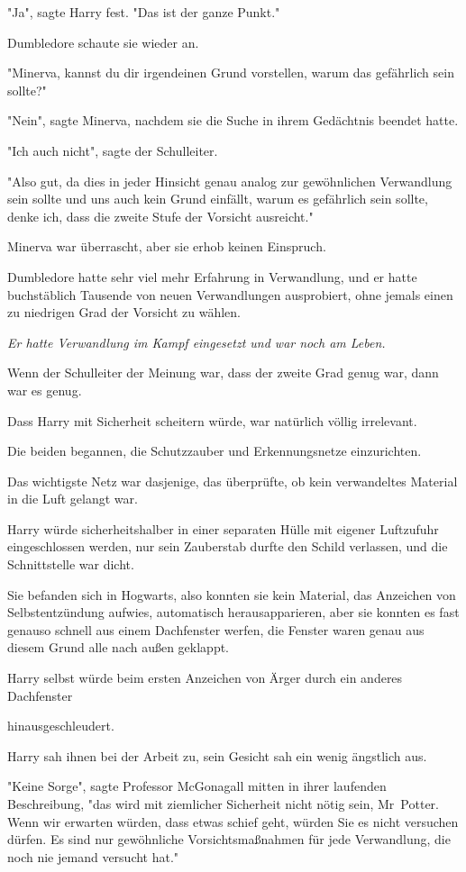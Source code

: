 {"Ja", sagte Harry fest. "Das ist der ganze Punkt."

Dumbledore schaute sie wieder an.

"Minerva, kannst du dir irgendeinen Grund vorstellen, warum das gefährlich sein sollte?"

"Nein", sagte Minerva, nachdem sie die Suche in ihrem Gedächtnis beendet hatte.

"Ich auch nicht", sagte der Schulleiter.

"Also gut, da dies in jeder Hinsicht genau analog zur gewöhnlichen Verwandlung sein sollte und uns auch kein Grund einfällt, warum es gefährlich sein sollte, denke ich, dass die zweite Stufe der Vorsicht ausreicht."

Minerva war überrascht, aber sie erhob keinen Einspruch.

Dumbledore hatte sehr viel mehr Erfahrung in Verwandlung, und er hatte buchstäblich Tausende von neuen Verwandlungen ausprobiert, ohne jemals einen zu niedrigen Grad der Vorsicht zu wählen.

\emph{Er hatte Verwandlung im Kampf eingesetzt und war noch am Leben.}

Wenn der Schulleiter der Meinung war, dass der zweite Grad genug war, dann war es genug.

Dass Harry mit Sicherheit scheitern würde, war natürlich völlig irrelevant.

Die beiden begannen, die Schutzzauber und Erkennungsnetze einzurichten.

Das wichtigste Netz war dasjenige, das überprüfte, ob kein verwandeltes Material in die Luft gelangt war.

Harry würde sicherheitshalber in einer separaten Hülle mit eigener Luftzufuhr eingeschlossen werden, nur sein Zauberstab durfte den Schild verlassen, und die Schnittstelle war dicht.

Sie befanden sich in Hogwarts, also konnten sie kein Material, das Anzeichen von Selbstentzündung aufwies, automatisch herausapparieren, aber sie konnten es fast genauso schnell aus einem Dachfenster werfen, die Fenster waren genau aus diesem Grund alle nach außen geklappt.

Harry selbst würde beim ersten Anzeichen von Ärger durch ein anderes Dachfenster

hinausgeschleudert.

Harry sah ihnen bei der Arbeit zu, sein Gesicht sah ein wenig ängstlich aus.

"Keine Sorge", sagte Professor McGonagall mitten in ihrer laufenden Beschreibung, "das wird mit ziemlicher Sicherheit nicht nötig sein, Mr~Potter. Wenn wir erwarten würden, dass etwas schief geht, würden Sie es nicht versuchen dürfen. Es sind nur gewöhnliche Vorsichtsmaßnahmen für jede Verwandlung, die noch nie jemand versucht hat."

}
